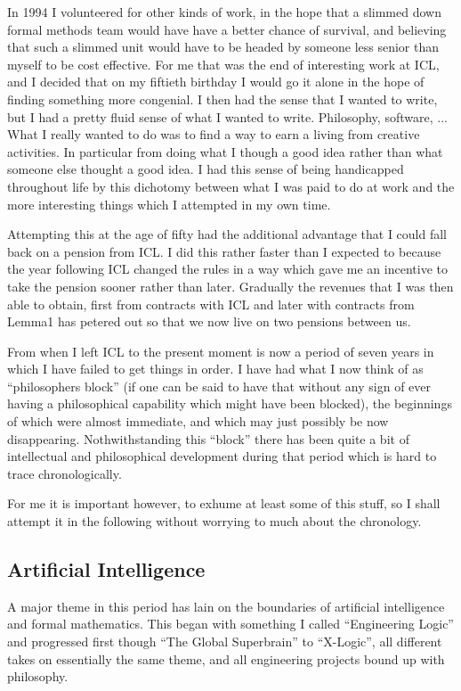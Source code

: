 \documentclass{rbjk}
\begin{document}
\begin{article}
In 1994 I volunteered for other kinds of work, in the hope that a slimmed down formal methods team would have have a better chance of survival, and believing that such a slimmed unit would have to be headed by someone less senior than myself to be cost effective.
For me that was the end of interesting work at ICL, and I decided that on my fiftieth birthday I would go it alone in the hope of finding something more congenial.
I then had the sense that I wanted to write, but I had a pretty fluid sense of what I wanted to write.
Philosophy, software, ...
What I really wanted to do was to find a way to earn a living from creative activities.
In particular from doing what I though a good idea rather than what someone else thought a good idea.
I had this sense of being handicapped throughout life by this dichotomy between what I was paid to do at work and the more interesting things which I attempted in my own time.

Attempting this at the age of fifty had the additional advantage that I could fall back on a pension from ICL.
I did this rather faster than I expected to because the year following ICL changed the rules in a way which gave me an incentive to take the pension sooner rather than later.
Gradually the revenues that I was then able to obtain, first from contracts with ICL and later with contracts from Lemma1 has petered out so that we now live on two pensions between us.

From when I left ICL to the present moment is now a period of seven years in which I have failed to get things in order.
I have had what I now think of as ``philosophers block'' (if one can be said to have that without any sign of ever having a philosophical capability which might have been blocked), the beginnings of which were almost immediate, and which may just possibly be now disappearing.
Nothwithstanding this ``block'' there has been quite a bit of intellectual and philosophical development during that period which is hard to trace chronologically.

For me it is important however, to exhume at least some of this stuff, so I shall attempt it in the following without worrying to much about the chronology.

\subsection{Artificial Intelligence}

A major theme in this period has lain on the boundaries of artificial intelligence and formal mathematics.
This began with something I called ``Engineering Logic'' and progressed first though ``The Global Superbrain'' to ``X-Logic'', all different takes on essentially the same theme, and all engineering projects bound up with philosophy.


\end{article}
\end{document}
